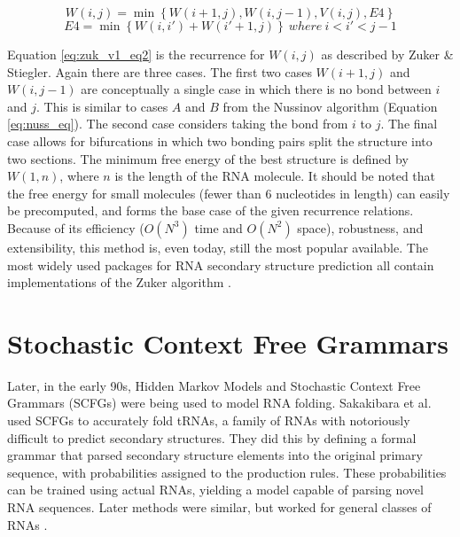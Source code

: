 \documentclass[12pt, a4paper]{article}
\begin{document}
\begin{equation} \label{eq:zuk_v1_eq2}
W (i, j) = \min \left\lbrace W(i + 1, j), W(i, j - 1), V(i, j), E4 \right\rbrace
\end{equation}
$$
E4 = \min \left\lbrace W (i, i') + W (i' + 1, j) \right\rbrace \: where \: i < i' < j - 1
$$

Equation \ref{eq:zuk_v1_eq2} is the recurrence for $W(i, j)$ as described by Zuker \& Stiegler.
Again there are three cases. The first two cases $W (i + 1, j)$ and $W(i, j - 1)$ are conceptually a single case in which there is no bond between $i$ and $j$. This is similar to cases $A$ and $B$ from the Nussinov algorithm (Equation \ref{eq:nuss_eq}). The second case considers taking the bond from
$i$ to $j$. The final case allows for bifurcations in which two bonding pairs split
the structure into two sections. The minimum free energy of the best structure is defined by $W(1, n)$, where $n$ is the length of the RNA molecule. It should
be noted that the free energy for small molecules (fewer than 6 nucleotides in length) can easily be
precomputed, and forms the base case of the given recurrence relations. Because of
its efficiency ($O(N^3)$ time and $O(N^2)$ space), robustness, and extensibility, this method is,
even today, still the most popular available. The most widely used packages for RNA secondary structure prediction all contain implementations of the Zuker algorithm \cite{lorenz2011viennarna, reuter2010rnastructure}.


\section{Stochastic Context Free Grammars}

Later, in the early 90s, Hidden Markov Models and Stochastic Context Free Grammars (SCFGs) were being used to model RNA folding. Sakakibara et al. \cite{sakakibara1994stochastic} used SCFGs to accurately fold tRNAs, a family of RNAs with notoriously difficult to predict secondary structures. They did this by defining a formal grammar that parsed secondary structure elements into the original primary sequence, with probabilities assigned to the production rules. These probabilities can be trained using actual RNAs, yielding a model capable of parsing novel RNA sequences. Later methods were similar, but worked for general classes of RNAs \cite{dowell2004evaluation, knudsen2003pfold}.
\end{document}
